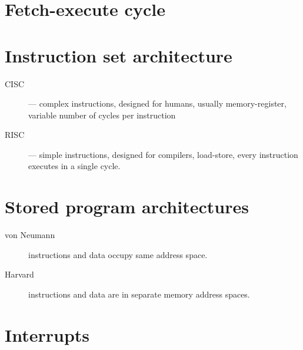 \section{Fetch-execute cycle}

\section{Instruction set architecture}

\begin{description}
\item[CISC] --- complex instructions, designed for humans, usually memory-register, variable number of cycles per instruction
\item[RISC] --- simple instructions, designed for compilers, load-store, every instruction executes in a single cycle.
\end{description}

\section{Stored program architectures}

\begin{description}
\item[von Neumann] instructions and data occupy same address space.
\item[Harvard] instructions and data are in separate memory address spaces. 
\end{description}

\section{Interrupts}
\label{sec:interrupts}


